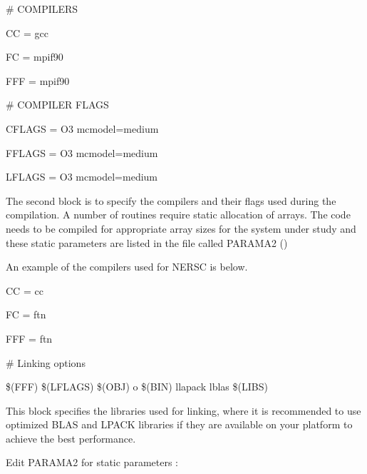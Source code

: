 \documentclass[letterpaper,10pt,english,openany,oneside]{sphinxmanual}
\begin{document}
\sphinxAtStartPar
\# COMPILERS

\sphinxAtStartPar
CC = gcc

\sphinxAtStartPar
FC = mpif90

\sphinxAtStartPar
FFF = mpif90

\sphinxAtStartPar
\# COMPILER FLAGS

\sphinxAtStartPar
CFLAGS = \sphinxhyphen{}O3 \sphinxhyphen{}mcmodel=medium

\sphinxAtStartPar
FFLAGS = \sphinxhyphen{}O3 \sphinxhyphen{}mcmodel=medium

\sphinxAtStartPar
LFLAGS = \sphinxhyphen{}O3 \sphinxhyphen{}mcmodel=medium

\sphinxAtStartPar
The second block is to specify the compilers and their flags used during the compilation. A number of routines require static allocation of arrays. The code needs to be compiled for appropriate array sizes for the system under study and these static parameters are listed in the file called PARAMA2 ()

\sphinxAtStartPar
An example of the compilers used for NERSC is below.

\sphinxAtStartPar
CC = cc

\sphinxAtStartPar
FC = ftn

\sphinxAtStartPar
FFF = ftn

\sphinxAtStartPar
{}

\sphinxAtStartPar
\# Linking options

\sphinxAtStartPar
\$(FFF) \$(LFLAGS) \$(OBJ) \sphinxhyphen{}o \$(BIN) \sphinxhyphen{}llapack \sphinxhyphen{}lblas \$(LIBS)

\sphinxAtStartPar
This block specifies the libraries used for linking, where it is recommended to use optimized BLAS and LPACK libraries if they are available on your platform to achieve the best performance.

\sphinxAtStartPar
Edit PARAMA2 for static parameters :
\end{document}
